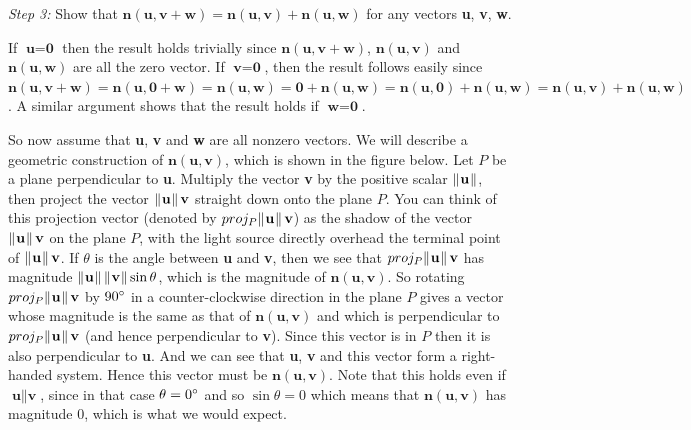 \par\noindent \emph{Step 3:} Show that $\textbf{n}(\textbf{u},\textbf{v} + \textbf{w}) =
\textbf{n}(\textbf{u},\textbf{v}) + \textbf{n}(\textbf{u},\textbf{w})$ for any vectors \textbf{u}, \textbf{v},
\textbf{w}.\vspace{1mm}
\par\noindent If $\textbf{u} = \textbf{0}$ then the result holds trivially since $\textbf{n}(\textbf{u},\textbf{v} +
\textbf{w})$, $\textbf{n}(\textbf{u},\textbf{v})$ and $\textbf{n}(\textbf{u},\textbf{w})$ are all the zero vector. If
$\textbf{v} = \textbf{0}$, then the result follows easily since $\textbf{n}(\textbf{u},\textbf{v} + \textbf{w}) =
\textbf{n}(\textbf{u},\textbf{0} + \textbf{w}) = \textbf{n}(\textbf{u},\textbf{w}) = \textbf{0} +
\textbf{n}(\textbf{u},\textbf{w}) = \textbf{n}(\textbf{u},\textbf{0}) + \textbf{n}(\textbf{u},\textbf{w}) =
\textbf{n}(\textbf{u},\textbf{v}) + \textbf{n}(\textbf{u},\textbf{w})$. A similar argument shows that the result holds
if $\textbf{w} = \textbf{0}$.

So now assume that \textbf{u}, \textbf{v} and \textbf{w} are all nonzero vectors.
We will describe a geometric construction of $\textbf{n}(\textbf{u},\textbf{v})$, which is shown in the
figure below. Let $P$ be a plane perpendicular to \textbf{u}. Multiply the vector \textbf{v} by the positive
scalar $\lVert\mspace{1mu}\textbf{u}\mspace{1mu}\rVert$, then project the vector $\lVert\mspace{1mu}\textbf{u}\mspace{1mu}\rVert\,\textbf{v}$ straight down onto the plane $P$.
You can think of this projection vector (denoted by $proj_{P} \lVert\mspace{1mu}\textbf{u}\mspace{1mu}\rVert\,\textbf{v}$) as the shadow of the
vector $\lVert\mspace{1mu}\textbf{u}\mspace{1mu}\rVert\,\textbf{v}$ on the plane $P$, with the light source directly overhead the terminal point of
$\lVert\mspace{1mu}\textbf{u}\mspace{1mu}\rVert\,\textbf{v}$. If $\theta$ is the angle between \textbf{u} and \textbf{v}, then we see that
$proj_{P} \lVert\mspace{1mu}\textbf{u}\mspace{1mu}\rVert\,\textbf{v}$ has magnitude
$\lVert\mspace{1mu}\textbf{u}\mspace{1mu}\rVert\,\lVert\mspace{1mu}\textbf{v}\mspace{1mu}\rVert \sin \theta$, which is the magnitude of $\textbf{n}(\textbf{u},\textbf{v})$. So
rotating $proj_{P} \lVert\mspace{1mu}\textbf{u}\mspace{1mu}\rVert\,\textbf{v}$ by $90^\circ$ in a counter-clockwise direction in the plane $P$
gives a vector whose magnitude is the same as that of $\textbf{n}(\textbf{u},\textbf{v})$ and which is perpendicular to
$proj_{P} \lVert\mspace{1mu}\textbf{u}\mspace{1mu}\rVert\,\textbf{v}$ (and hence perpendicular to \textbf{v}). Since this vector is in $P$ then it is
also perpendicular to \textbf{u}. And we can see that \textbf{u}, \textbf{v} and this vector form a right-handed system.
Hence this vector must be $\textbf{n}(\textbf{u},\textbf{v})$. Note that this holds even if $\textbf{u} \parallel
\textbf{v}$, since in that case $\theta = 0^\circ$ and so $\sin \theta = 0$ which means that
$\textbf{n}(\textbf{u},\textbf{v})$ has magnitude $0$, which is what we would expect.

